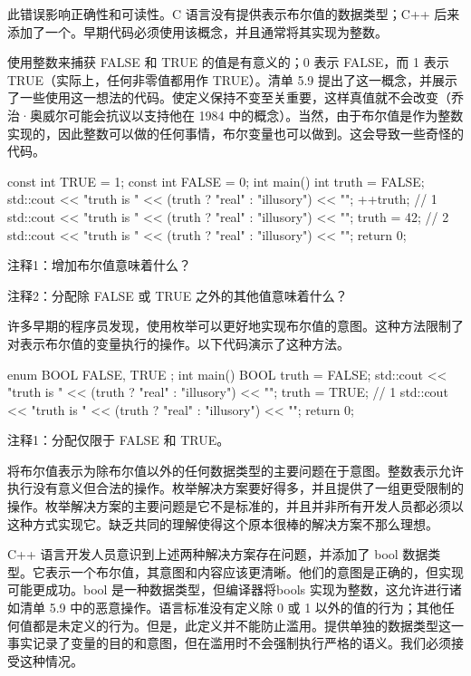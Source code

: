 此错误影响正确性和可读性。C 语言没有提供表示布尔值的数据类型；C++ 后来添加了一个。早期代码必须使用该概念，并且通常将其实现为整数。


使用整数来捕获 FALSE 和 TRUE 的值是有意义的；0 表示 FALSE，而 1 表示 TRUE（实际上，任何非零值都用作 TRUE）。清单 5.9 提出了这一概念，并展示了一些使用这一想法的代码。使定义保持不变至关重要，这样真值就不会改变（乔治·奥威尔可能会抗议以支持他在 1984 中的概念）。当然，由于布尔值是作为整数实现的，因此整数可以做的任何事情，布尔变量也可以做到。这会导致一些奇怪的代码。


\begin{cpp}
const int TRUE = 1;
const int FALSE = 0;
int main() {
  int truth = FALSE;
  std::cout << "truth is " << (truth ? "real" : "illusory") << "\n";
  ++truth; // 1
  std::cout << "truth is " << (truth ? "real" : "illusory") << "\n";
  truth = 42; // 2
  std::cout << "truth is " << (truth ? "real" : "illusory") << "\n";
  return 0;
}
\end{cpp}

{\footnotesize
注释1：增加布尔值意味着什么？

注释2：分配除 FALSE 或 TRUE 之外的其他值意味着什么？
}

许多早期的程序员发现，使用枚举可以更好地实现布尔值的意图。这种方法限制了对表示布尔值的变量执行的操作。以下代码演示了这种方法。


\begin{cpp}
enum BOOL { FALSE, TRUE };
int main() {
  BOOL truth = FALSE;
  std::cout << "truth is " << (truth ? "real" : "illusory") << "\n";
  truth = TRUE; // 1
  std::cout << "truth is " << (truth ? "real" : "illusory") << "\n";
  return 0;
}
\end{cpp}

{\footnotesize
注释1：分配仅限于 FALSE 和 TRUE。
}


将布尔值表示为除布尔值以外的任何数据类型的主要问题在于意图。整数表示允许执行没有意义但合法的操作。枚举解决方案要好得多，并且提供了一组更受限制的操作。枚举解决方案的主要问题是它不是标准的，并且并非所有开发人员都必须以这种方式实现它。缺乏共同的理解使得这个原本很棒的解决方案不那么理想。


C++ 语言开发人员意识到上述两种解决方案存在问题，并添加了 bool 数据类型。它表示一个布尔值，其意图和内容应该更清晰。他们的意图是正确的，但实现可能更成功。bool 是一种数据类型，但编译器将bools 实现为整数，这允许进行诸如清单 5.9 中的恶意操作。语言标准没有定义除 0 或 1 以外的值的行为；其他任何值都是未定义的行为。但是，此定义并不能防止滥用。提供单独的数据类型这一事实记录了变量的目的和意图，但在滥用时不会强制执行严格的语义。我们必须接受这种情况。

